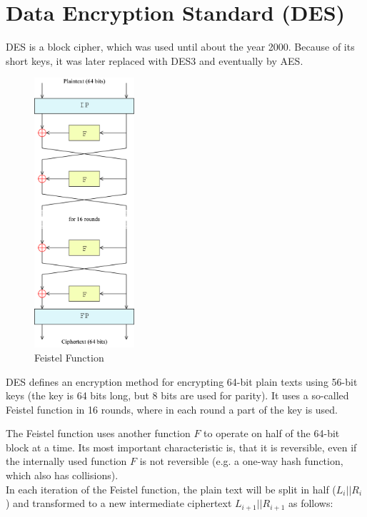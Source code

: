 \section{Data Encryption Standard (DES)}

DES is a block cipher, which was used until about the year 2000. Because of its short keys, it was later replaced with DES3 and eventually by AES.

\begin{figure}
    \begin{center}
        \includegraphics[width=0.33\textwidth]{gfx/feistel_function.png}
    \end{center}
    \caption{Feistel Function}
    \label{fig:feistel}
\end{figure}

DES defines an encryption method for encrypting 64-bit plain texts using 56-bit keys (the key is 64 bits long, but 8 bits are used for parity). It uses a so-called Feistel function in 16 rounds, where in each round a part of the key is used.

The Feistel function uses another function $F$ to operate on half of the 64-bit block at a time. Its most important characteristic is, that it is reversible, even if the internally used function $F$ is not reversible (e.g. a one-way hash function, which also has collisions).\\
In each iteration of the Feistel function, the plain text will be split in half ($L_i||R_i$) and transformed to a new intermediate ciphertext $L_{i+1}||R_{i+1}$ as follows:

